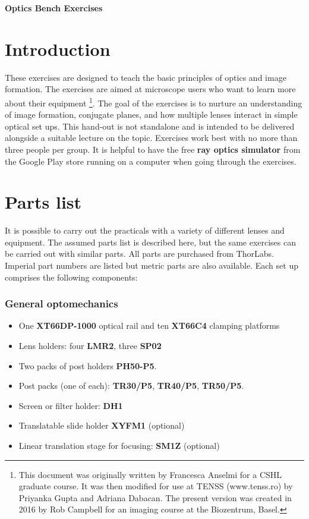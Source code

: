 \documentclass[a4paper]{report}
\begin{document}
\setcounter{secnumdepth}{2}

\begin{center}
\textbf{\Large{Optics Bench Exercises}}
\end{center}

\section{Introduction}
These exercises are designed to teach the basic principles of optics and image formation.
The exercises are aimed at microscope users who want to learn more about their equipment
\footnote{This document was originally written by Francesca Anselmi for a CSHL graduate course.
It was then modified for use at TENSS (www.tenss.ro) by Priyanka Gupta and Adriana Dabacan. 
The present version was created in 2016 by Rob Campbell for an imaging course at the Biozentrum, Basel.}.
The goal of the exercises is to nurture an understanding of image formation, conjugate planes, and how multiple lenses interact in simple optical set ups. 
This hand-out is not standalone and is intended to be delivered alongside a suitable lecture on the topic.
Exercises work best with no more than three people per group.
It is helpful to have the free \textbf{ray optics simulator} from the Google Play store running on a computer when going through the exercises. 

\section{Parts list}
It is possible to carry out the practicals with a variety of different lenses and equipment. 
The assumed parts list is described here, but the same exercises can be carried out with similar parts. 
All parts are purchased from ThorLabs.
Imperial part numbers are listed but metric parts are also available. 
Each set up comprises the following components:


\subsubsection{General optomechanics}
\begin{itemize}
\item One \textbf{XT66DP-1000} optical rail and ten \textbf{XT66C4} clamping platforms
\item Lens holders: four \textbf{LMR2}, three \textbf{SP02}
\item Two packs of post holders \textbf{PH50-P5}.
\item Post packs (one of each): \textbf{TR30/P5}, \textbf{TR40/P5}, \textbf{TR50/P5}.
\item Screen or filter holder: \textbf{DH1}
\item Translatable slide holder \textbf{XYFM1} (optional)
\item Linear translation stage for focusing: \textbf{SM1Z} (optional)
\end{itemize}
\end{document}
